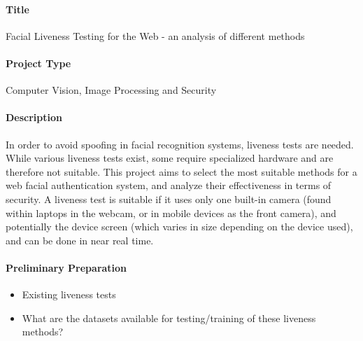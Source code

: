 \documentclass{article}
\begin{document}
    
    \paragraph{Title}
        Facial Liveness Testing for the Web - an analysis of different methods
    \paragraph{Project Type}
        Computer Vision, Image Processing and Security
    \paragraph{Description}
    In order to avoid spoofing in facial recognition systems, liveness tests are needed. While various liveness tests exist,
    some require specialized hardware and are therefore not suitable. This project aims to select the most suitable methods for
    a web facial authentication system, and analyze their effectiveness in terms of security. A liveness test is suitable if it
    uses only one built-in camera (found within laptops in the webcam, or in mobile devices as the front camera), and potentially
    the device screen (which varies in size depending on the device used), and can be done in near real time.
    \paragraph{Preliminary Preparation}
        \begin{itemize}
            \item Existing liveness tests
            \item What are the datasets available for testing/training of these liveness methods?
        \end{itemize}
\end{document}
